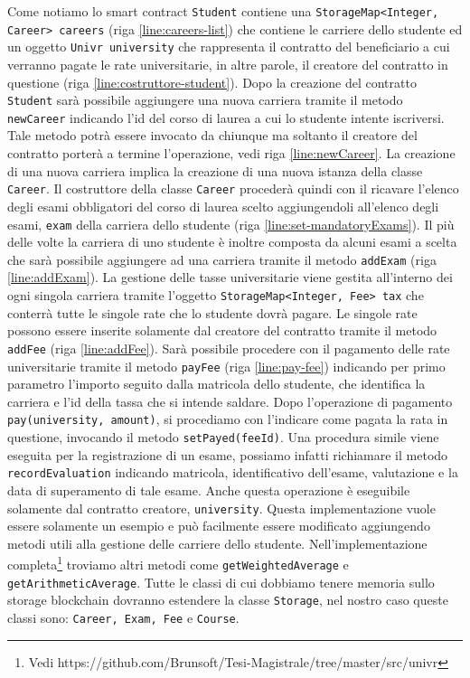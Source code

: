 %
Come notiamo lo smart contract \lstinline|Student| contiene una \lstinline|StorageMap<Integer, Career> careers| (riga \ref{line:careers-list}) che contiene le carriere dello studente ed un oggetto \lstinline|Univr university| che rappresenta il contratto del beneficiario a cui verranno pagate le rate universitarie, in altre parole, il creatore del contratto in questione (riga \ref{line:costruttore-student}). Dopo la creazione del contratto \lstinline|Student| sarà possibile aggiungere una nuova carriera tramite il metodo \lstinline|newCareer| indicando l'id del corso di laurea a cui lo studente intente iscriversi. Tale metodo potrà essere invocato da chiunque ma soltanto il creatore del contratto porterà a termine l'operazione, vedi riga \ref{line:newCareer}. La creazione di una nuova carriera implica la creazione di una nuova istanza della classe \lstinline|Career|. Il costruttore della classe \lstinline|Career| procederà quindi con il ricavare l'elenco degli esami obbligatori del corso di laurea scelto aggiungendoli all'elenco degli esami, \lstinline|exam| della carriera dello studente (riga \ref{line:set-mandatoryExams}). Il più delle volte la carriera di uno studente è inoltre composta da alcuni esami a scelta che sarà possibile aggiungere ad una carriera tramite il metodo \lstinline|addExam| (riga \ref{line:addExam}). La gestione delle tasse universitarie viene gestita all'interno dei ogni singola carriera tramite l'oggetto \lstinline|StorageMap<Integer, Fee> tax| che conterrà tutte le singole rate che lo studente dovrà pagare. Le singole rate possono essere inserite solamente dal creatore del contratto tramite il metodo \lstinline|addFee| (riga \ref{line:addFee}). Sarà possibile procedere con il pagamento delle rate universitarie tramite il metodo \lstinline|payFee| (riga \ref{line:pay-fee}) indicando per primo parametro l'importo seguito dalla matricola dello studente, che identifica la carriera e l'id della tassa che si intende saldare. Dopo l'operazione di pagamento \lstinline|pay(university, amount)|, si procediamo con l'indicare come pagata la rata in questione, invocando il metodo \lstinline|setPayed(feeId)|. Una procedura simile viene eseguita per la registrazione di un esame, possiamo infatti richiamare il metodo \lstinline|recordEvaluation| indicando matricola, identificativo dell'esame, valutazione e la data di superamento di tale esame. Anche questa operazione è eseguibile solamente dal contratto creatore, \lstinline|university|. Questa implementazione vuole essere solamente un esempio e può facilmente essere modificato aggiungendo metodi utili alla gestione delle carriere dello studente. Nell'implementazione completa\footnote{Vedi https://github.com/Brunsoft/Tesi-Magistrale/tree/master/src/univr} troviamo altri metodi come \lstinline|getWeightedAverage| e \lstinline|getArithmeticAverage|. Tutte le classi di cui dobbiamo tenere memoria sullo storage blockchain dovranno estendere la classe \lstinline|Storage|, nel nostro caso queste classi sono: \lstinline|Career, Exam, Fee| e \lstinline|Course|.

